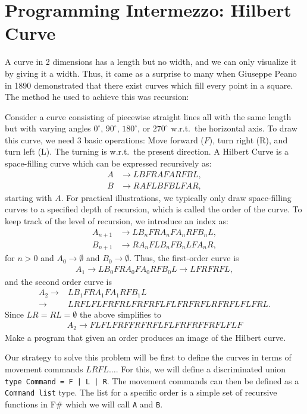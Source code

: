 \documentclass[fsharpNotes.tex]{subfiles}
\begin{document}
\section{Programming Intermezzo: Hilbert Curve}
A curve in 2 dimensions has a length but no width, and we can only visualize it by giving it a width. Thus, it came as a surprise to many when Giuseppe Peano in 1890 demonstrated that there exist curves which fill every point in a square. The method he used to achieve this was recursion:
\begin{task}
  Consider a curve consisting of piecewise straight lines all with the same length but with varying angles $0^{\circ}$, $90^{\circ}$, $180^{\circ}$, or $270^{\circ}$ w.r.t.\ the horizontal axis. To draw this curve, we need 3 basic operations: Move forward ($F$), turn right (R), and turn left (L). The turning is w.r.t.\ the present direction. A Hilbert Curve is a space-filling curve which can be expressed recursively as:
\begin{align}
  A &\rightarrow LBFRAFARFBL,\label{eq:hilbertA}\\
  B &\rightarrow RAFLBFBLFAR,\label{eq:hilbertB}
\end{align}
starting with $A$. For practical illustrations, we typically only draw space-filling curves to a specified depth of recursion, which is called the order of the curve. To keep track of the level of recursion, we introduce an index as:
\begin{align*}
  A_{n+1} &\rightarrow LB_nFRA_nFA_nRFB_nL,\\
  B_{n+1} &\rightarrow RA_nFLB_nFB_nLFA_nR,
\end{align*}
for $n>0$ and $A_0\rightarrow\emptyset$ and $B_0\rightarrow\emptyset$. Thus, the first-order curve is
\begin{align*}
  A_1 \rightarrow LB_0FRA_0FA_0RFB_0L \rightarrow LFRFRFL,
\end{align*}
and the second order curve is
\begin{align*}
  A_2 
  \rightarrow &LB_1FRA_1FA_1RFB_1L \\
  \rightarrow &LRFLFLFRFRLFRFRFLFLFRFRFLRFRFLFLFRL.
\end{align*}
Since $LR = RL = \emptyset$ the above simplifies to
\begin{align*}
  A_2 \rightarrow FLFLFRFFRFRFLFLFRFRFFRFLFLF
\end{align*}
Make a program that given an order produces an image of the Hilbert curve.
\end{task}
Our strategy to solve this problem will be first to define the curves in terms of movement commands $LRFL\ldots$. For this, we will define a discriminated union
\lstinline{type Command = F | L | R}. The movement commands can then be defined as a \lstinline{Command list} type. The list for a specific order is a simple set of recursive functions in F\# which we will call \lstinline{A} and \lstinline{B}.
\end{document}
